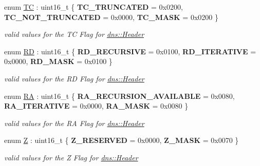 \begin{DoxyCompactItemize}
\item 
enum \hyperlink{namespacedns_af39b19c1f00f88b095db77dc42eee9a1}{TC} \+: uint16\+\_\+t \{ {\bfseries T\+C\+\_\+\+T\+R\+U\+N\+C\+A\+T\+ED} = 0x0200, 
{\bfseries T\+C\+\_\+\+N\+O\+T\+\_\+\+T\+R\+U\+N\+C\+A\+T\+ED} = 0x0000, 
{\bfseries T\+C\+\_\+\+M\+A\+SK} = 0x0200
 \}\hypertarget{namespacedns_af39b19c1f00f88b095db77dc42eee9a1}{}\label{namespacedns_af39b19c1f00f88b095db77dc42eee9a1}
\begin{DoxyCompactList}\small\item\em valid values for the TC Flag for \hyperlink{structdns_1_1Header}{dns\+::\+Header} \end{DoxyCompactList}
\item 
enum \hyperlink{namespacedns_a854e4abf87b535622f79e7ff75eb2a16}{RD} \+: uint16\+\_\+t \{ {\bfseries R\+D\+\_\+\+R\+E\+C\+U\+R\+S\+I\+VE} = 0x0100, 
{\bfseries R\+D\+\_\+\+I\+T\+E\+R\+A\+T\+I\+VE} = 0x0000, 
{\bfseries R\+D\+\_\+\+M\+A\+SK} = 0x0100
 \}\hypertarget{namespacedns_a854e4abf87b535622f79e7ff75eb2a16}{}\label{namespacedns_a854e4abf87b535622f79e7ff75eb2a16}
\begin{DoxyCompactList}\small\item\em valid values for the RD Flag for \hyperlink{structdns_1_1Header}{dns\+::\+Header} \end{DoxyCompactList}
\item 
enum \hyperlink{namespacedns_ad3e1d06842c1184a727c9f02f145a2b8}{RA} \+: uint16\+\_\+t \{ {\bfseries R\+A\+\_\+\+R\+E\+C\+U\+R\+S\+I\+O\+N\+\_\+\+A\+V\+A\+I\+L\+A\+B\+LE} = 0x0080, 
{\bfseries R\+A\+\_\+\+I\+T\+E\+R\+A\+T\+I\+VE} = 0x0000, 
{\bfseries R\+A\+\_\+\+M\+A\+SK} = 0x0080
 \}\hypertarget{namespacedns_ad3e1d06842c1184a727c9f02f145a2b8}{}\label{namespacedns_ad3e1d06842c1184a727c9f02f145a2b8}
\begin{DoxyCompactList}\small\item\em valid values for the RA Flag for \hyperlink{structdns_1_1Header}{dns\+::\+Header} \end{DoxyCompactList}
\item 
enum \hyperlink{namespacedns_ad80d44e1e7fa84c98fd5a99a90c50b57}{Z} \+: uint16\+\_\+t \{ {\bfseries Z\+\_\+\+R\+E\+S\+E\+R\+V\+ED} = 0x0000, 
{\bfseries Z\+\_\+\+M\+A\+SK} = 0x0070
 \}\hypertarget{namespacedns_ad80d44e1e7fa84c98fd5a99a90c50b57}{}\label{namespacedns_ad80d44e1e7fa84c98fd5a99a90c50b57}
\begin{DoxyCompactList}\small\item\em valid values for the Z Flag for \hyperlink{structdns_1_1Header}{dns\+::\+Header} \end{DoxyCompactList}

\end{DoxyCompactItemize}
